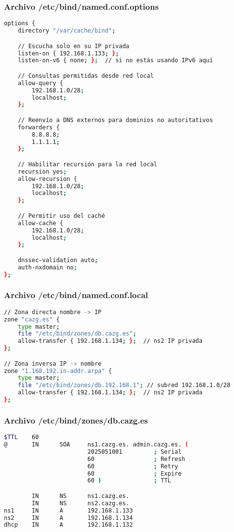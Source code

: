 \subsubsection*{Archivo /etc/bind/named.conf.options}
\label{Apendice2:named.conf.options_dns_primario}
\begin{lstlisting}[language=bash]
options {
    directory "/var/cache/bind";

    // Escucha solo en su IP privada
    listen-on { 192.168.1.133; };
    listen-on-v6 { none; };  // si no estás usando IPv6 aquí

    // Consultas permitidas desde red local
    allow-query {
        192.168.1.0/28;
        localhost;
    };

    // Reenvío a DNS externos para dominios no autoritativos
    forwarders {
        8.8.8.8;
        1.1.1.1;
    };

    // Habilitar recursión para la red local
    recursion yes;
    allow-recursion {
        192.168.1.0/28;
        localhost;
    };

    // Permitir uso del caché
    allow-cache {
        192.168.1.0/28;
        localhost;
    };

    dnssec-validation auto;
    auth-nxdomain no;
};
\end{lstlisting}

\subsubsection*{Archivo /etc/bind/named.conf.local}
\label{Apendice2:named.conf.local_dns_primario}
\begin{lstlisting}[language=bash]
// Zona directa nombre -> IP
zone "cazg.es" {
    type master;
    file "/etc/bind/zones/db.cazg.es";
    allow-transfer { 192.168.1.134; };  // ns2 IP privada 
};

// Zona inversa IP -> nombre
zone "1.168.192.in-addr.arpa" {
    type master;
    file "/etc/bind/zones/db.192.168.1"; // subred 192.168.1.0/28
    allow-transfer { 192.168.1.134; };  // ns2 IP privada
}; 
\end{lstlisting}

\subsubsection*{Archivo /etc/bind/zones/db.cazg.es}
\label{Apendice2:db.cazg.es_dns_primario}
\begin{lstlisting}[language=bash]
$TTL    60
@       IN      SOA     ns1.cazg.es. admin.cazg.es. (
                        2025051001         ; Serial
                        60                 ; Refresh
                        60                 ; Retry
                        60                 ; Expire
                        60 )               ; TTL

        IN      NS      ns1.cazg.es.
        IN      NS      ns2.cazg.es.
ns1     IN      A       192.168.1.133
ns2     IN      A       192.168.1.134
dhcp    IN      A       192.168.1.132 
\end{lstlisting}

